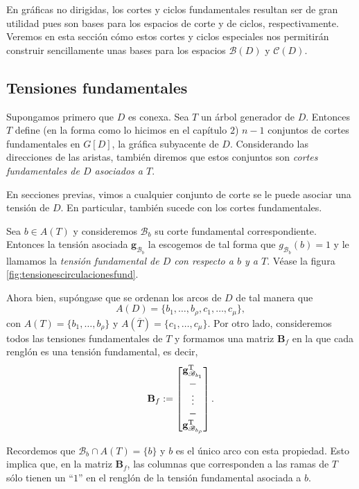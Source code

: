 En gráficas no dirigidas, los cortes y ciclos fundamentales resultan ser de gran utilidad pues son bases para los espacios de corte y de ciclos, respectivamente. Veremos en esta sección cómo estos cortes y ciclos especiales nos permitirán construir sencillamente unas bases para los espacios $\mathcal{B}(D)$ y $\mathcal{C}(D)$.

\subsection{Tensiones fundamentales}
Supongamos primero que $D$ es conexa. Sea $T$ un árbol generador de $D$. Entonces $T$ define (en la forma como lo hicimos en el capítulo $2$) $n-1$ conjuntos de cortes fundamentales en $G[D]$, la gráfica subyacente de $D$. Considerando las direcciones de las aristas, también diremos que estos conjuntos son \textit{cortes fundamentales de $D$ asociados a $T$}.

En secciones previas, vimos a cualquier conjunto de corte se le puede asociar una tensión de $D$. En particular, también sucede con los cortes fundamentales.

Sea $b \in A(T)$ y consideremos $\mathscr{B}_{b}$ su corte fundamental correspondiente. Entonces la tensión asociada $\mathbf{g}_{\mathscr{B}_{b}}$ la escogemos de tal forma que $g_{\mathscr{B}_{b}}(b) = 1$ y le llamamos la \textit{tensión fundamental de $D$ con respecto a $b$ y a $T$}. Véase la figura \ref{fig:tensionescirculacionesfund}.

Ahora bien, supóngase que se ordenan los arcos de $D$ de tal manera que $$A(D) = \{b_{1}, \ldots, b_{\rho}, c_{1}, \ldots, c_{\mu}\},$$ con $A(T) = \{b_{1}, \ldots, b_{\rho}\}$ y $A(\overline{T}) = \{c_{1}, \ldots, c_{\mu}\}$. Por otro lado, consideremos todos las tensiones fundamentales de $T$ y formamos una matriz $\mathbf{B}_{f}$ en la que cada renglón es una tensión fundamental, es decir, 
$$
\mathbf{B}_{f} := \begin{bmatrix}
\mathbf{g}_{\mathscr{B}_{b_{1}}}^{\textnormal{T}} \\
\-- \\
\vdots \\
\-- \\
\mathbf{g}_{\mathscr{B}_{b_{\rho}}}^{\textnormal{T}}
\end{bmatrix}.
$$

Recordemos que  $\mathscr{B}_{b} \cap A(T) = \{b\}$ y $b$ es el único arco con esta propiedad. Esto implica que, en la matriz $\mathbf{B}_{f}$, las columnas que corresponden a las ramas de $T$ sólo tienen un ``$1$'' en el renglón de la tensión fundamental asociada a $b$.  

